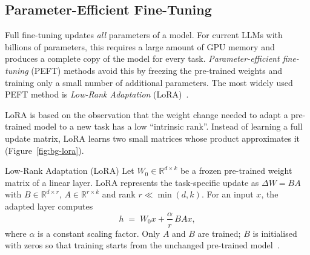 
\subsection{Parameter-Efficient Fine-Tuning}
\label{sec:bg-peft}

Full fine-tuning updates \emph{all} parameters of a model. For current LLMs
with billions of parameters, this requires a large amount of GPU memory and
produces a complete copy of the model for every task. \emph{Parameter-efficient
fine-tuning} (PEFT) methods avoid this by freezing the pre-trained weights and
training only a small number of additional parameters. The most widely used
PEFT method is \emph{Low-Rank Adaptation} (LoRA)~\cite{hu2022lora}.

LoRA is based on the observation that the weight change needed to adapt a
pre-trained model to a new task has a low ``intrinsic rank''. Instead of
learning a full update matrix, LoRA learns two small matrices whose product
approximates it (Figure~\ref{fig:bg-lora}).

\begin{bgdefinition}{Low-Rank Adaptation (LoRA)}
Let $W_0 \in \mathbb{R}^{d \times k}$ be a frozen pre-trained weight matrix
of a linear layer. LoRA represents the task-specific update as
$\Delta W = BA$ with $B \in \mathbb{R}^{d \times r}$,
$A \in \mathbb{R}^{r \times k}$ and rank $r \ll \min(d,k)$. For an input
$x$, the adapted layer computes
\[
  h \;=\; W_0 x + \frac{\alpha}{r}\, B A x ,
\]
where $\alpha$ is a constant scaling factor. Only $A$ and $B$ are trained;
$B$ is initialised with zeros so that training starts from the unchanged
pre-trained model~\cite{hu2022lora}.
\end{bgdefinition}

